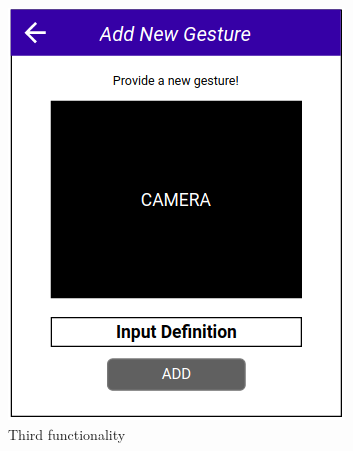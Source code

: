 \documentclass[journal]{./IEEE/IEEEtran}
\begin{document}
\begin{figure}[ht!]
    \centering
    \includegraphics[width=.95\linewidth]{./images/4.png}
    \caption{Third functionality}
    \label{fig:label4}
\end{figure}
\end{document}
